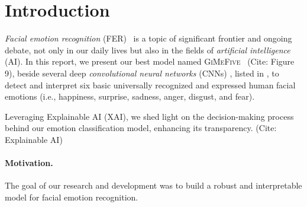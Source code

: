 \section{Introduction}
\label{sec:intro}

\textit{Facial emotion recognition} (FER)~\cite{Ko18,JainSS19,YinTLS019,Malik0R21} is a topic of significant frontier and ongoing debate, 
not only in our daily lives but also in the fields of \textit{artificial intelligence} (AI).
In this report, we present our best model named \textsc{GiMeFive}~\cite{GiMeFive, sec:evaluation:inter} (Cite: Figure 9), beside several deep
\textit{convolutional neural networks} (CNNs) , listed in , to detect and interpret six basic universally recognized and expressed human facial emotions (i.e., happiness, surprise, sadness, anger, disgust, and fear).

Leveraging Explainable AI (XAI), we shed light on the decision-making process behind our emotion classification model, enhancing its transparency. (Cite: Explainable AI)


\paragraph{Motivation.}
The goal of our research and development was to build a robust and interpretable model for facial emotion recognition. 

